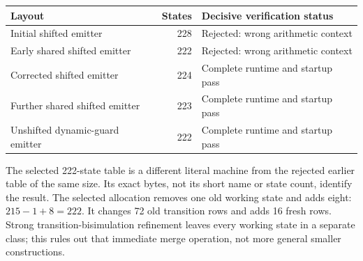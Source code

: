 \begin{center}
\begin{tabular}{lrl}
\toprule
Layout & States & Decisive verification status\\\midrule
Initial shifted emitter & 228 & Rejected: wrong arithmetic context\\
Early shared shifted emitter & 222 & Rejected: wrong arithmetic context\\
Corrected shifted emitter & 224 & Complete runtime and startup pass\\
Further shared shifted emitter & 223 & Complete runtime and startup pass\\
Unshifted dynamic-guard emitter & 222 & Complete runtime and startup pass\\
\bottomrule
\end{tabular}
\end{center}
The selected 222-state table is a different literal machine from the
rejected earlier table of the same size. Its exact bytes, not its short
name or state count, identify the result. The selected allocation removes
one old working state and adds eight: $215-1+8=222$. It changes 72 old
transition rows and adds 16 fresh rows. Strong transition-bisimulation
refinement leaves every working state in a separate class; this rules out
that immediate merge operation, not more general smaller constructions.
